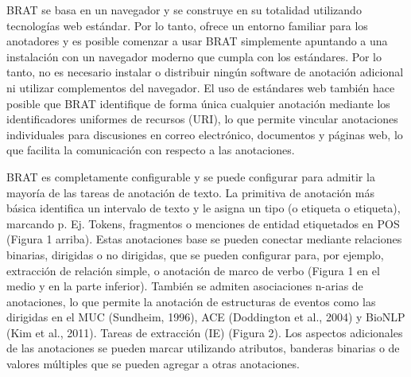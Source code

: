 \begin{description}
BRAT se basa en un navegador y se construye en su totalidad utilizando tecnologías web estándar. Por lo tanto, ofrece un entorno familiar para los anotadores y es posible comenzar a usar BRAT simplemente apuntando a una instalación con un navegador moderno que cumpla con los estándares. Por lo tanto, no es necesario instalar o distribuir ningún software de anotación adicional ni utilizar complementos del navegador. El uso de estándares web también hace posible que BRAT identifique de forma única cualquier anotación mediante los identificadores uniformes de recursos (URI), lo que permite vincular anotaciones individuales para discusiones en correo electrónico, documentos y páginas web, lo que facilita la comunicación con respecto a las anotaciones.

BRAT es completamente configurable y se puede configurar para admitir la mayoría de las tareas de anotación de texto. La primitiva de anotación más básica identifica un intervalo de texto y le asigna un tipo (o etiqueta o etiqueta), marcando p. Ej. Tokens, fragmentos o menciones de entidad etiquetados en POS (Figura 1 arriba). Estas anotaciones base se pueden conectar mediante relaciones binarias, dirigidas o no dirigidas, que se pueden configurar para, por ejemplo, extracción de relación simple, o anotación de marco de verbo (Figura 1 en el medio y en la parte inferior). También se admiten asociaciones n-arias de anotaciones, lo que permite la anotación de estructuras de eventos como las dirigidas en el MUC (Sundheim, 1996), ACE (Doddington et al., 2004) y BioNLP (Kim et al., 2011). Tareas de extracción (IE) (Figura 2). Los aspectos adicionales de las anotaciones se pueden marcar utilizando atributos, banderas binarias o de valores múltiples que se pueden agregar a otras anotaciones.


\end{description}
